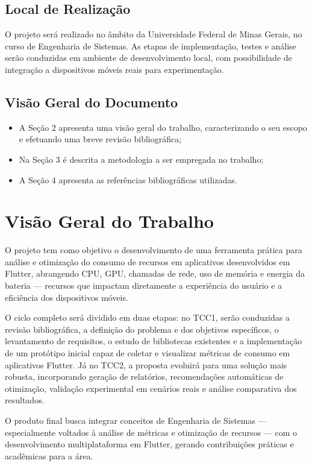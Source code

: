 \documentclass[12pt,a4paper]{article}
\begin{document}
\subsection{Local de Realização}
O projeto será realizado no âmbito da Universidade Federal de Minas Gerais, no curso de Engenharia de Sistemas. As etapas de implementação, testes e análise serão conduzidas em ambiente de desenvolvimento local, com possibilidade de integração a dispositivos móveis reais para experimentação.

\subsection{Visão Geral do Documento}
\begin{itemize}
    \item A Seção 2 apresenta uma visão geral do trabalho, caracterizando o seu escopo e efetuando uma breve revisão bibliográfica;
    \item Na Seção 3 é descrita a metodologia a ser empregada no trabalho;
    \item A Seção 4 apresenta as referências bibliográficas utilizadas.
\end{itemize}

\section{Visão Geral do Trabalho}

O projeto tem como objetivo o desenvolvimento de uma ferramenta prática para análise e otimização do consumo de recursos em aplicativos desenvolvidos em Flutter, abrangendo CPU, GPU, chamadas de rede, uso de memória e energia da bateria — recursos que impactam diretamente a experiência do usuário e a eficiência dos dispositivos móveis.

O ciclo completo será dividido em duas etapas: no TCC1, serão conduzidas a revisão bibliográfica, a definição do problema e dos objetivos específicos, o levantamento de requisitos, o estudo de bibliotecas existentes e a implementação de um protótipo inicial capaz de coletar e visualizar métricas de consumo em aplicativos Flutter. Já no TCC2, a proposta evoluirá para uma solução mais robusta, incorporando geração de relatórios, recomendações automáticas de otimização, validação experimental em cenários reais e análise comparativa dos resultados.

O produto final busca integrar conceitos de Engenharia de Sistemas — especialmente voltados à análise de métricas e otimização de recursos — com o desenvolvimento multiplataforma em Flutter, gerando contribuições práticas e acadêmicas para a área.
\end{document}
